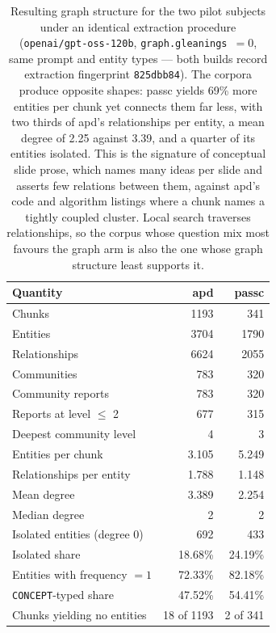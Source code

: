 \begin{table}[htbp]
  \centering
  \caption{Resulting graph structure for the two pilot subjects under an identical extraction
    procedure (\texttt{openai/gpt-oss-120b}, \texttt{graph.gleanings}~$=0$, same prompt and entity
    types --- both builds record extraction fingerprint \texttt{825dbb84}). The corpora produce
    opposite shapes: passc yields 69\% more entities per chunk yet connects them far less, with
    two thirds of apd's relationships per entity, a mean degree of 2.25 against 3.39, and a
    quarter of its entities isolated. This is the signature of conceptual slide prose, which names
    many ideas per slide and asserts few relations between them, against apd's code and algorithm
    listings where a chunk names a tightly coupled cluster. Local search traverses relationships,
    so the corpus whose question mix most favours the graph arm is also the one whose graph
    structure least supports it.}
  \label{tab:graph-structure-two-subjects}
  \begin{tabular}{lrr}
    \toprule
    Quantity & apd & passc \\
    \midrule
    Chunks                                &   1193 &    341 \\
    \midrule
    Entities                              &   3704 &   1790 \\
    Relationships                         &   6624 &   2055 \\
    Communities                           &    783 &    320 \\
    Community reports                     &    783 &    320 \\
    Reports at level $\le$ 2              &    677 &    315 \\
    Deepest community level               &      4 &      3 \\
    \midrule
    Entities per chunk                    &  3.105 &  5.249 \\
    Relationships per entity              &  1.788 &  1.148 \\
    Mean degree                           &  3.389 &  2.254 \\
    Median degree                         &      2 &      2 \\
    \midrule
    Isolated entities (degree 0)          &    692 &    433 \\
    Isolated share                        & 18.68\% & 24.19\% \\
    Entities with frequency $=1$          & 72.33\% & 82.18\% \\
    \texttt{CONCEPT}-typed share          & 47.52\% & 54.41\% \\
    Chunks yielding no entities           & 18 of 1193 & 2 of 341 \\
    \bottomrule
  \end{tabular}


\end{table}
